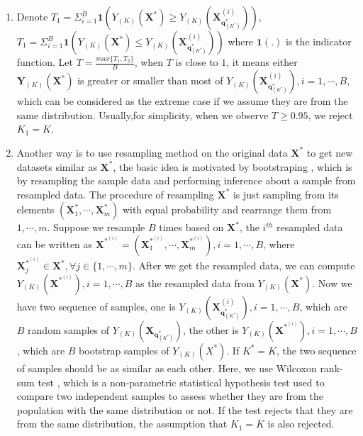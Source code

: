 \documentclass[12pt]{article}
\begin{document}
\begin {enumerate}[Method 1:]
\item Denote $T_1=\Sigma_{i=1}^B \pmb 1(Y_{(K)}(\pmb X^*) \geq Y_{(K)}(\pmb X_{\pmb q_{(K^*)}^*}^{(i)}))$,$T_1=\Sigma_{i=1}^B \pmb 1(Y_{(K)}(\pmb X^*) \leq Y_{(K)}(\pmb X_{\pmb q_{(K^*)}^*}^{(i)}))$ where $\pmb 1(.)$ is the indicator function. Let $T=\frac{max\{T_1,T_2\}}{B}$, when $T$ is close to $1$, it means either  $\pmb Y_{(K)}(\pmb X^*)$ is greater or smaller than most of  $Y_{(K)}(\pmb X_{\pmb q_{(K^*)}^*}^{(i)}),i=1,\cdots,B$, which can be considered as the extreme case if we assume they are from the same distribution. Usually,for simplicity, when we observe $T \geq 0.95$, we reject  $K_1=K$.

\item Another way is to use resampling method on the original data $\pmb X^*$ to get new datasets similar as $\pmb X^*$, the basic idea is motivated by bootstraping \cite{efron1994introduction}, which is by resampling the sample data and performing inference about a sample from resampled data. The procedure of resampling $\pmb X^*$ is just sampling from its elements $(\pmb X_1^*,\cdots,\pmb X_m^*)$ with equal probability and rearrange them from $1,\cdots,m$. Suppose we resample $B$ times based on $\pmb X^*$, the $i^{th}$ resampled data can be written as  $\pmb X^{*^{(i)}}=(\pmb X_1^{*^{(i)}},\cdots,\pmb X_m^{*^{(i)}}),i=1,\cdots,B$, where $\pmb X_j^{*^{(i)}} \in \pmb X^*,\forall j \in \{1,\cdots,m\}$. After we get the resampled data, we can compute $Y_{(K)}(\pmb X^{*^{(i)}}),i=1,\cdots,B$ as the resampled data from $Y_{(K)}(\pmb X^*)$. Now we have two sequence of samples, one is $Y_{(K)}(\pmb X_{\pmb q_{(K^*)}^*}^{(i)}),i=1,\cdots,B$, which are $B$ random samples of $Y_{(K)}(\pmb X_{\pmb q_{(K^*)}^*})$, the other is  $Y_{(K)}(\pmb X^{*^{(i)}}),i=1,\cdots,B$ , which are $B$ bootstrap samples of $Y_{(K)}(X^*)$. If $K^*=K$, the two sequence of samples should be as similar as each other. Here, we use Wilcoxon rank-sum test \cite{wilcoxon1945individual}, which is a non-parametric statistical hypothesis test used to compare two independent samples to assess whether they are from the population with the same distribution or not. If the test rejects that they are from the same distribution, the assumption that $K_1=K$ is also rejected.
  
\end {enumerate} 
\end{document}
